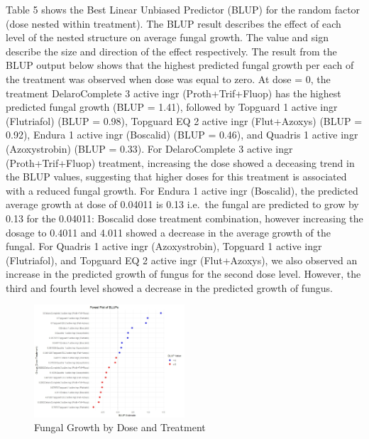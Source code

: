 \documentclass[
  10pt,
  letterpaper,
  twocolumn]{article}
\begin{document}
Table 5 shows the Best Linear Unbiased Predictor (BLUP) for the random
factor (dose nested within treatment). The BLUP result describes the
effect of each level of the nested structure on average fungal growth.
The value and sign describe the size and direction of the effect
respectively. The result from the BLUP output below shows that the
highest predicted fungal growth per each of the treatment was observed
when dose was equal to zero. At dose = 0, the treatment DelaroComplete 3
active ingr (Proth+Trif+Fluop) has the highest predicted fungal growth
(BLUP = 1.41), followed by Topguard 1 active ingr (Flutriafol) (BLUP =
0.98), Topguard EQ 2 active ingr (Flut+Azoxys) (BLUP = 0.92), Endura 1
active ingr (Boscalid) (BLUP = 0.46), and Quadris 1 active ingr
(Azoxystrobin) (BLUP = 0.33). For DelaroComplete 3 active ingr
(Proth+Trif+Fluop) treatment, increasing the dose showed a deceasing
trend in the BLUP values, suggesting that higher doses for this
treatment is associated with a reduced fungal growth. For Endura 1
active ingr (Boscalid), the predicted average growth at dose of 0.04011
is 0.13 i.e.~the fungal are predicted to grow by 0.13 for the 0.04011:
Boscalid dose treatment combination, however increasing the dosage to
0.4011 and 4.011 showed a decrease in the average growth of the fungal.
For Quadris 1 active ingr (Azoxystrobin), Topguard 1 active ingr
(Flutriafol), and Topguard EQ 2 active ingr (Flut+Azoxys), we also
observed an increase in the predicted growth of fungus for the second
dose level. However, the third and fourth level showed a decrease in the
predicted growth of fungus.

\begin{figure}

{\centering \includegraphics[width=0.5\textwidth,height=\textheight]{Fig18.jpeg}

}

\caption{Fungal Growth by Dose and Treatment}

\end{figure}
\end{document}
